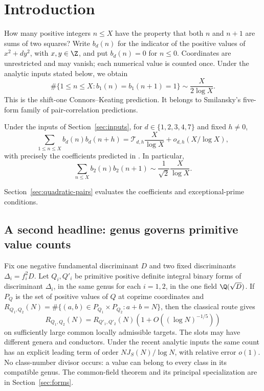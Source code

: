 \section{Introduction}
How many positive integers \(n\le X\) have the property that both
\(n\) and \(n+1\) are sums of two squares? Write \(b_d(n)\) for
the indicator of the positive values of \(x^2+dy^2\), with
\(x,y\in\Z\), and put \(b_d(n)=0\) for \(n\le0\).
Coordinates are unrestricted and may vanish; each numerical value
is counted once. Under the analytic inputs stated below, we obtain
\begin{equation}\label{eq:ck-headline}
 \#\{1\le n\le X:b_1(n)=b_1(n+1)=1\}
                         \sim\frac{X}{2\log X}.
\end{equation}
This is the shift-one Connors--Keating prediction. It belongs to
Smilansky's five-form family of pair-correlation predictions.

\begin{corollary}\label{cor:smilansky-five-pairs}
Under the inputs of Section~\ref{sec:inputs}, for
\(d\in\{1,2,3,4,7\}\) and fixed \(h\ne0\),
\[
 \sum_{1\le n\le X}b_d(n)b_d(n+h)
       =\mathscr T_{d,h}\frac X{\log X}+o_{d,h}(X/\log X),
\]
with precisely the coefficients predicted in
\cite[Section 6.3, equations (6.2)--(6.4)]{smilansky}.
In particular,
\begin{equation}\label{eq:minus-eight-shift-one}
 \sum_{n\le X}b_2(n)b_2(n+1)
                       \sim\frac1{\sqrt2}\frac X{\log X}.
\end{equation}
\end{corollary}

Section~\ref{sec:quadratic-pairs} evaluates the coefficients and exceptional-prime conditions.

\subsection{A second headline: genus governs primitive value counts}

Fix one negative fundamental discriminant \(D\) and two fixed
discriminants \(\Delta_i=f_i^2D\). Let \(Q_i,Q'_i\) be primitive
positive definite integral binary forms of discriminant \(\Delta_i\),
in the same genus for each \(i=1,2\), in the one field \(\Q(\sqrt D)\).
If \(P_Q\) is the set of positive values of
\(Q\) at coprime coordinates and
\(R_{Q_1,Q_2}(N)=\#\{(a,b)\in P_{Q_1}\times P_{Q_2}:a+b=N\}\),
then the classical route gives
\begin{equation}\label{eq:genus-headline}
 R_{Q_1,Q_2}(N)=R_{Q'_1,Q'_2}(N)
                  \left(1+O((\log N)^{-1/5})\right)
\end{equation}
on sufficiently large common locally admissible targets.
The slots may have different genera and conductors. Under the recent
analytic inputs the same count has an explicit leading term of order
\(NJ_S(N)/\log N\), with relative error \(o(1)\). No class-number divisor
occurs: a value can belong to every class in its compatible genus.
The common-field theorem and its principal specialization are in
Section~\ref{sec:forms}.

